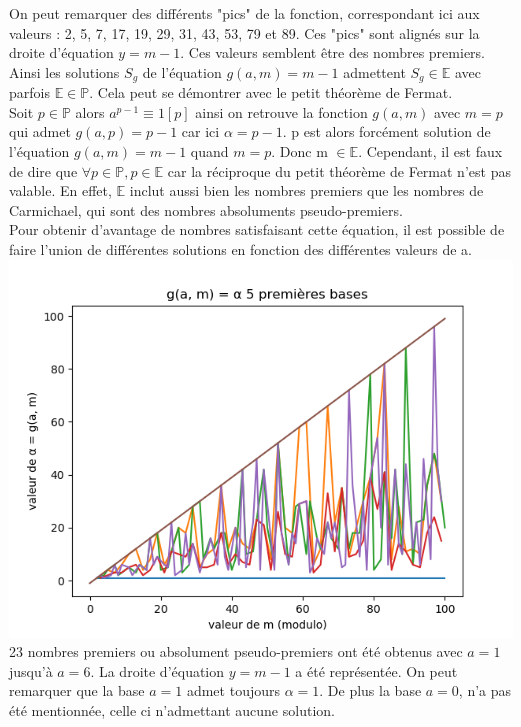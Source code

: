 \documentclass{article}
\begin{document}
On peut remarquer des différents "pics" de la fonction, correspondant ici aux valeurs : 2, 5, 7, 17, 19, 29, 31, 43, 53, 79 et 89. Ces "pics" sont alignés sur la droite d'équation $y=m-1$. Ces valeurs semblent être des nombres premiers.\\
Ainsi les solutions $S_g$ de l'équation $g(a, m) = m - 1$ admettent $S_g\in\mathbb{E}$ avec parfois $\mathbb{E}\in\mathbb{P}$.
Cela peut se démontrer avec le petit théorème de Fermat.\\
Soit $p\in\mathbb{P}$ alors $a^{p-1}\equiv1[p]$ ainsi on retrouve la fonction $g(a, m)$ avec $m=p$ qui admet $g(a, p) = p - 1$ car ici $\alpha=p-1$. p est alors forcément solution de l'équation $g(a, m) = m - 1$ quand $m = p$. Donc m $\in\mathbb{E}$. Cependant, il est faux de dire que $\forall p \in\mathbb{P},p\in\mathbb{E}$ car la réciproque du petit théorème de Fermat n'est pas valable. En effet, $\mathbb{E}$ inclut aussi bien les nombres premiers que les nombres de Carmichael, qui sont des nombres absoluments pseudo-premiers.\\
Pour obtenir d'avantage de nombres satisfaisant cette équation, il est possible de faire l'union de différentes solutions en fonction des différentes valeurs de a.\\
\includegraphics{images/Figure_3.png}\\
23 nombres premiers ou absolument pseudo-premiers ont été obtenus avec $a = 1$ jusqu'à $a=6$. La droite d'équation $y = m - 1$ a été représentée. On peut remarquer que la base $a=1$ admet toujours $\alpha = 1$. De plus la base $a=0$, n'a pas été mentionnée, celle ci n'admettant aucune solution.\\
\end{document}
